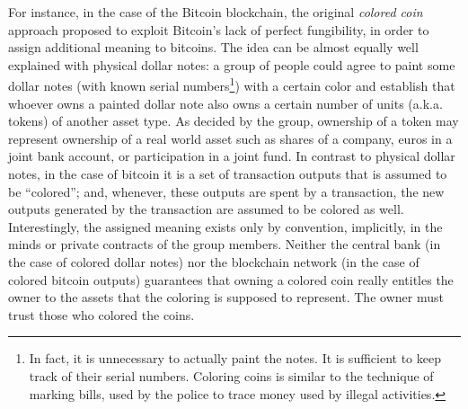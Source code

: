 \documentclass{llncs}
\begin{document}
For instance, in the case of the Bitcoin blockchain, the original \emph{colored coin} approach proposed to exploit Bitcoin's lack of perfect fungibility, in order to assign additional meaning to bitcoins. The idea can be almost equally well explained with physical dollar notes: a group of people could agree to paint some dollar notes (with known serial numbers\footnote{In fact, it is unnecessary to actually paint the notes. It is sufficient to keep track of their serial numbers. Coloring coins is similar to the technique of marking bills, used by the police to trace money used by illegal activities.}) with a certain color and establish that whoever owns a painted dollar note also owns a certain number of units (a.k.a. tokens) of another asset type. As decided by the group, ownership of a token may represent ownership of a real world asset such as shares of a company, euros in a joint bank account, or participation in a joint fund. In contrast to physical dollar notes, in the case of bitcoin it is a set of transaction outputs that is assumed to be ``colored''; and, whenever, these outputs are spent by a transaction, the new outputs generated by the transaction are assumed to be colored as well. %
Interestingly, the assigned meaning exists only by convention, implicitly, in the minds or private contracts of the group members. Neither the central bank (in the case of colored dollar notes) nor the blockchain network (in the case of colored bitcoin outputs) guarantees that owning a colored coin really entitles the owner to the assets that the coloring is supposed to represent. The owner must trust those who colored the coins. 
\end{document}
